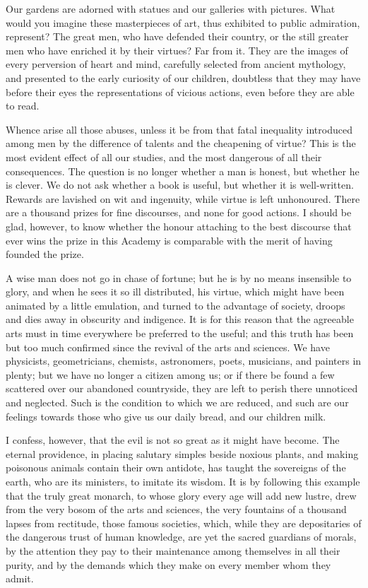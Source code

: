 Our gardens are adorned with statues and our galleries with pictures.
What would you imagine these masterpieces of art, thus exhibited to
public admiration, represent? The great men, who have defended their
country, or the still greater men who have enriched it by their
virtues? Far from it. They are the images of every perversion of heart
and mind, carefully selected from ancient mythology, and presented to
the early curiosity of our children, doubtless that they may have
before their eyes the representations of vicious actions, even before
they are able to read.

Whence arise all those abuses, unless it be from that fatal
inequality introduced among men by the difference of talents and the
cheapening of virtue? This is the most evident effect of all our
studies, and the most dangerous of all their consequences. The
question is no longer whether a man is honest, but whether he is
clever. We do not ask whether a book is useful, but whether it is
well-written. Rewards are lavished on wit and ingenuity, while virtue
is left unhonoured. There are a thousand prizes for fine discourses,
and none for good actions. I should be glad, however, to know whether
the honour attaching to the best discourse that ever wins the prize in
this Academy is comparable with the merit of having founded the prize.

A wise man does not go in chase of fortune; but he is by no means
insensible to glory, and when he sees it so ill distributed, his
virtue, which might have been animated by a little emulation, and
turned to the advantage of society, droops and dies away in obscurity
and indigence. It is for this reason that the agreeable arts must in
time everywhere be preferred to the useful; and this truth has been
but too much confirmed since the revival of the arts and sciences. We
have physicists, geometricians, chemists, astronomers, poets,
musicians, and painters in plenty; but we have no longer a citizen
among us; or if there be found a few scattered over our abandoned
countryside, they are left to perish there unnoticed and neglected.
Such is the condition to which we are reduced, and such are our
feelings towards those who give us our daily bread, and our children
milk.

I confess, however, that the evil is not so great as it might have
become. The eternal providence, in placing salutary simples beside
noxious plants, and making poisonous animals contain their own
antidote, has taught the sovereigns of the earth, who are its
ministers, to imitate its wisdom. It is by following this example that
the truly great monarch, to whose glory every age will add new lustre,
drew from the very bosom of the arts and sciences, the very fountains
of a thousand lapses from rectitude, those famous societies, which,
while they are depositaries of the dangerous trust of human knowledge,
are yet the sacred guardians of morals, by the attention 
they pay to their maintenance among themselves in all their purity,
and by the demands which they make on every member whom they admit.


